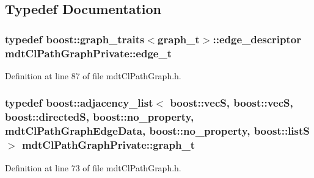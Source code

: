 \subsection{Typedef Documentation}
\hypertarget{namespacemdt_cl_path_graph_private_a96eb891b98d89bbea2f573cd8f3accd2}{
\subsubsection[{edge\-\_\-t}]{\setlength{\rightskip}{0pt plus 5cm}typedef boost\-::graph\-\_\-traits$<${\bf graph\-\_\-t}$>$\-::edge\-\_\-descriptor {\bf mdt\-Cl\-Path\-Graph\-Private\-::edge\-\_\-t}}}\label{namespacemdt_cl_path_graph_private_a96eb891b98d89bbea2f573cd8f3accd2}


Definition at line 87 of file mdt\-Cl\-Path\-Graph.\-h.

\hypertarget{namespacemdt_cl_path_graph_private_a9a28712932316ef1dd4caf737a6d7e07}{
\subsubsection[{graph\-\_\-t}]{\setlength{\rightskip}{0pt plus 5cm}typedef boost\-::adjacency\-\_\-list$<$ boost\-::vec\-S, boost\-::vec\-S, boost\-::directed\-S, boost\-::no\-\_\-property, {\bf mdt\-Cl\-Path\-Graph\-Edge\-Data}, boost\-::no\-\_\-property, boost\-::list\-S $>$ {\bf mdt\-Cl\-Path\-Graph\-Private\-::graph\-\_\-t}}}\label{namespacemdt_cl_path_graph_private_a9a28712932316ef1dd4caf737a6d7e07}


Definition at line 73 of file mdt\-Cl\-Path\-Graph.\-h.

